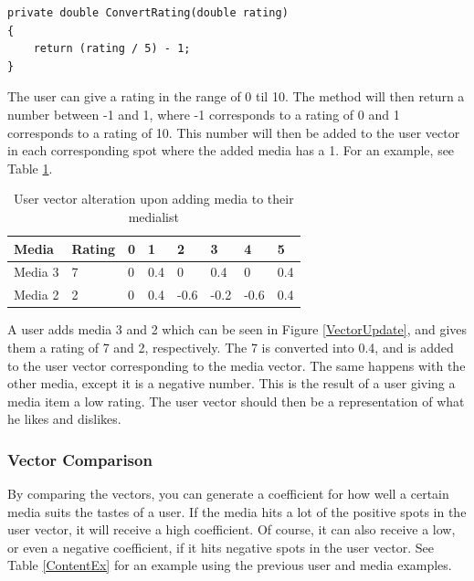 \begin{lstlisting}[caption={The CompareUserPair method of the recommendation algorithm},label={ConvertRating}]
private double ConvertRating(double rating)
{
	return (rating / 5) - 1;
}
\end{lstlisting}

The user can give a rating in the range of 0 til 10. The method will then return a number between -1 and 1, where -1 corresponds to a rating of 0 and 1 corresponds to a rating of 10. This number will then be added to the user vector in each corresponding spot where the added media has a 1. For an example, see Table \ref{AddMediaEx}.

\begin{table}[htb]
\centering
\begin{tabular}{|l|l|l|l|l|l|l|l|} \hline
	\textbf{Media} & \textbf{Rating} & \textbf{0} & \textbf{1} & \textbf{2} & \textbf{3} & \textbf{4} & \textbf{5} \\ \hline
	Media 3 & 7 & 0 & 0.4 & 0 & 0.4 & 0 & 0.4 \\ \hline
	Media 2 & 2 & 0 & 0.4 & -0.6 & -0.2 & -0.6 & 0.4 \\ \hline
\end{tabular}
\caption{User vector alteration upon adding media to their medialist}
\label{AddMediaEx}
\end{table}

A user adds media 3 and 2 which can be seen in Figure \ref{VectorUpdate}, and gives them a rating of 7 and 2, respectively. The 7 is converted into 0.4, and is added to the user vector corresponding to the media vector. The same happens with the other media, except it is a negative number. This is the result of a user giving a media item a low rating. The user vector should then be a representation of what he likes and dislikes.

\subsubsection{Vector Comparison}

By comparing the vectors, you can generate a coefficient for how well a certain media suits the tastes of a user. If the media hits a lot of the positive spots in the user vector, it will receive a high coefficient. Of course, it can also receive a low, or even a negative coefficient, if it hits negative spots in the user vector. See Table \ref{ContentEx} for an example using the previous user and media examples.

